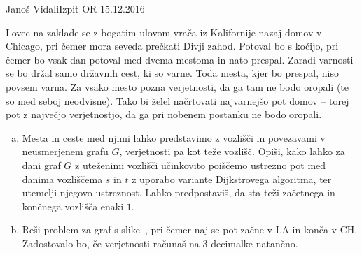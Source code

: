 \begin{naloga}{Janoš Vidali}{Izpit OR 15.12.2016}
\begin{vprasanje}[zaklad]
Lovec na zaklade se z bogatim ulovom
vrača iz Kalifornije nazaj domov v Chicago,
pri čemer mora seveda prečkati Divji zahod.
Potoval bo s kočijo,
pri čemer bo vsak dan potoval med dvema mestoma in nato prespal.
Zaradi varnosti se bo držal samo državnih cest, ki so varne.
Toda mesta, kjer bo prespal, niso povsem varna.
Za vsako mesto pozna verjetnosti,
da ga tam ne bodo oropali (te so med seboj neodvisne).
Tako bi želel načrtovati najvarnejšo pot domov
-- torej pot z največjo verjetnostjo,
da ga pri nobenem postanku ne bodo oropali.

\begin{enumerate}[(a)]
\item Mesta in ceste med njimi lahko predstavimo z vozlišči in povezavami
v ne\-usme\-rje\-nem grafu $G$, verjetnosti pa kot teže vozlišč.
Opiši, kako lahko za dani graf $G$ z uteženimi vozlišči
učinkovito poiščemo ustrezno pot med danima vozliščema $s$ in $t$
z uporabo variante Dijkstrovega algoritma,
ter utemelji njegovo ustreznost.
Lahko predpostaviš, da sta teži začetnega in končnega vozlišča enaki $1$.

\item Reši problem za graf s slike~\fig{},
pri čemer naj se pot začne v LA in konča v CH.
Zadostovalo bo, če verjetnosti računaš na $3$ decimalke natančno.
\end{enumerate}

\begin{slika}
\end{slika}
\end{vprasanje}
\end{naloga}
